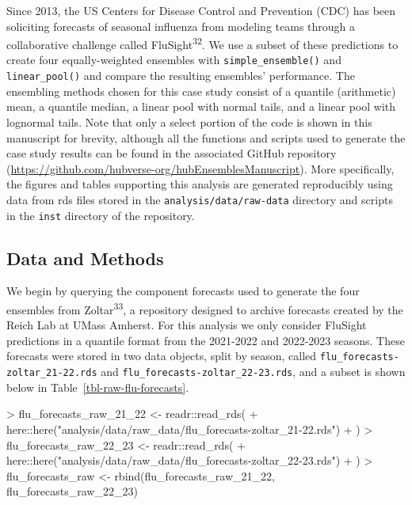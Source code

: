 \documentclass[
  letterpaper,
  DIV=11,
  numbers=noendperiod]{scrartcl}
\newenvironment{Shaded}{\begin{snugshade}}{\end{snugshade}}
\newcommand{\FunctionTok}[1]{\textcolor[rgb]{0.28,0.35,0.67}{#1}}
\newcommand{\NormalTok}[1]{\textcolor[rgb]{0.00,0.23,0.31}{#1}}
\newcommand{\OtherTok}[1]{\textcolor[rgb]{0.00,0.23,0.31}{#1}}
\newcommand{\SpecialCharTok}[1]{\textcolor[rgb]{0.37,0.37,0.37}{#1}}
\newcommand{\StringTok}[1]{\textcolor[rgb]{0.13,0.47,0.30}{#1}}
\begin{document}
Since 2013, the US Centers for Disease Control and Prevention (CDC) has
been soliciting forecasts of seasonal influenza from modeling teams
through a collaborative challenge called FluSight\textsuperscript{32}.
We use a subset of these predictions to create four equally-weighted
ensembles with \texttt{simple\_ensemble()} and \texttt{linear\_pool()}
and compare the resulting ensembles' performance. The ensembling methods
chosen for this case study consist of a quantile (arithmetic) mean, a
quantile median, a linear pool with normal tails, and a linear pool with
lognormal tails. Note that only a select portion of the code is shown in
this manuscript for brevity, although all the functions and scripts used
to generate the case study results can be found in the associated GitHub
repository
(\url{https://github.com/hubverse-org/hubEnsemblesManuscript}). More
specifically, the figures and tables supporting this analysis are
generated reproducibly using data from rds files stored in the
\texttt{analysis/data/raw-data} directory and scripts in the
\texttt{inst} directory of the repository.

\subsection{Data and Methods}\label{data-and-methods}

We begin by querying the component forecasts used to generate the four
ensembles from Zoltar\textsuperscript{33}, a repository designed to
archive forecasts created by the Reich Lab at UMass Amherst. For this
analysis we only consider FluSight predictions in a quantile format from
the 2021-2022 and 2022-2023 seasons. These forecasts were stored in two
data objects, split by season, called
\texttt{flu\_forecasts-zoltar\_21-22.rds} and
\texttt{flu\_forecasts-zoltar\_22-23.rds}, and a subset is shown below
in Table~\ref{tbl-raw-flu-forecasts}.

\begin{Shaded}
\begin{Highlighting}[]
\SpecialCharTok{\textgreater{}}\NormalTok{ flu\_forecasts\_raw\_21\_22 }\OtherTok{\textless{}{-}}\NormalTok{ readr}\SpecialCharTok{::}\FunctionTok{read\_rds}\NormalTok{(}
\SpecialCharTok{+}\NormalTok{     here}\SpecialCharTok{::}\FunctionTok{here}\NormalTok{(}\StringTok{"analysis/data/raw\_data/flu\_forecasts{-}zoltar\_21{-}22.rds"}\NormalTok{)}
\SpecialCharTok{+}\NormalTok{   )}
\SpecialCharTok{\textgreater{}}\NormalTok{ flu\_forecasts\_raw\_22\_23 }\OtherTok{\textless{}{-}}\NormalTok{ readr}\SpecialCharTok{::}\FunctionTok{read\_rds}\NormalTok{(}
\SpecialCharTok{+}\NormalTok{     here}\SpecialCharTok{::}\FunctionTok{here}\NormalTok{(}\StringTok{"analysis/data/raw\_data/flu\_forecasts{-}zoltar\_22{-}23.rds"}\NormalTok{)}
\SpecialCharTok{+}\NormalTok{   )}
\SpecialCharTok{\textgreater{}}\NormalTok{ flu\_forecasts\_raw }\OtherTok{\textless{}{-}} \FunctionTok{rbind}\NormalTok{(flu\_forecasts\_raw\_21\_22, flu\_forecasts\_raw\_22\_23)}
\end{Highlighting}
\end{Shaded}
\end{document}
